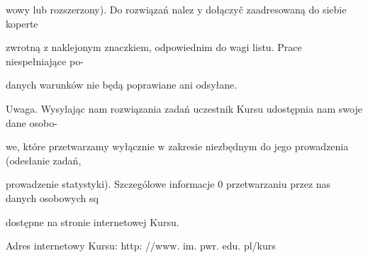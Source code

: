 \documentclass[a4paper,12pt]{article}
\begin{document}
wowy lub rozszerzony). Do rozwiązań nalez $\mathrm{y}$ dołączyč zaadresowaną do siebie koperte

zwrotną $\mathrm{z}$ naklejonym znaczkiem, odpowiednim do wagi listu. Prace niespełniające po-

danych warunków nie będą poprawiane ani odsyłane.

Uwaga. Wysylając nam rozwiązania zadań uczestnik Kursu udostępnia nam swoje dane osobo-

we, które przetwarzamy wyłącznie $\mathrm{w}$ zakresie niezbędnym do jego prowadzenia (odesłanie zadań,

prowadzenie statystyki). Szczególowe informacje $0$ przetwarzaniu przez nas danych osobowych sq

dostępne na stronie internetowej Kursu.

Adres internetowy Kursu: http: //www. im. pwr. edu. pl/kurs
\end{document}
